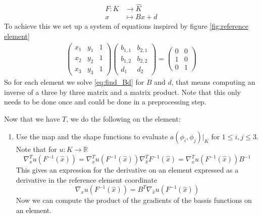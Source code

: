 \documentclass[../Main/main.tex]{subfiles}
\begin{document}
\begin{enumerate}
		\begin{equation}
			\begin{aligned}
				F: K &\rightarrow \hat{K}\\
				x &\mapsto B x + d
			\end{aligned}
		\end{equation}
		To achieve this we set up a system of equations inspired by figure \ref{fig:reference element}
		\begin{gather}\label{eq:find_Bd}
			\begin{pmatrix}
				x_1 & y_1 & 1\\ 
				x_2 & y_2 & 1\\ 
				x_3 & y_3 & 1
			\end{pmatrix}\begin{pmatrix}
				b_{1,1} & b_{2,1}\\ 
				b_{1,2} & b_{2,2}\\ 
				d_1 & d_2
			\end{pmatrix}=
			\begin{pmatrix}
				0 &0 \\ 
				1& 0\\ 
				0 &1 
			\end{pmatrix}
		\end{gather}
		So for each element we solve \eqref{eq:find_Bd} for $B$ and $d$, that means computing an inverse of a three by three matrix and a matrix product. Note that this only needs to be done once and could be done in a preprocessing step. \par
		Now that we have $T$, we do the following on the element:
		\begin{enumerate}
					\item Use the map and the shape functions to evaluate $a(\phi_i,\phi_j)|_K$  for $1\leq i,j \leq 3$. Note that for $u: K \rightarrow \mathbb{R}$
			\begin{equation}
				\nabla^T_{\hat{x}} u(F^{-1}(\hat{x})) = \nabla^T_{x}u(F^{-1}(\hat{x}))\nabla^T_{\hat{x}} F^{-1}(\hat{x}) =\nabla^T_{x}u(F^{-1}(\hat{x})) B^{-1}
			\end{equation}
			This gives an expression for the derivative on an element expressed as a derivative in the reference element coordinate
			\begin{equation}
				\nabla_{x}u(F^{-1}(\hat{x})) = B^T \nabla_{\hat{x}} u(F^{-1}(\hat{x}))
			\end{equation}
			Now we can compute the product of the gradients of the bassis functions on an element.
			\begin{equation}\label{eq:elementgradient}

\end{equation}
\end{enumerate}
\end{enumerate}
\end{document}
